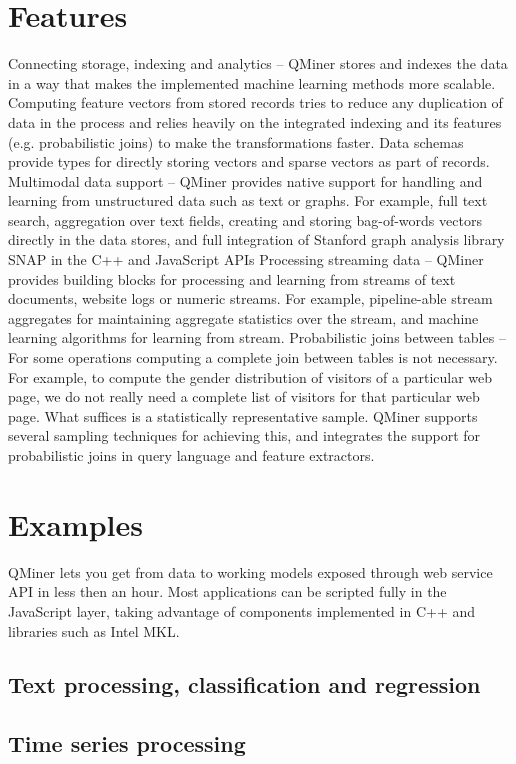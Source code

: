 \documentclass{article} %
\begin{document}
\section{Features}
Connecting storage, indexing and analytics – QMiner stores and indexes the data in a way that makes the implemented machine learning methods more scalable. Computing feature vectors from stored records tries to reduce any duplication of data in the process and relies heavily on the integrated indexing and its features (e.g. probabilistic joins) to make the transformations faster. Data schemas provide types for directly storing vectors and sparse vectors as part of records.
Multimodal data support – QMiner provides native support for handling and learning from unstructured data such as text or graphs. For example, full text search, aggregation over text fields, creating and storing bag-of-words vectors directly in the data stores, and full integration of Stanford graph analysis library SNAP in the C++ and JavaScript APIs
Processing streaming data – QMiner provides building blocks for processing and learning from streams of text documents, website logs or numeric streams. For example, pipeline-able stream aggregates for maintaining aggregate statistics over the stream, and machine learning algorithms for learning from stream.
Probabilistic joins between tables – For some operations computing a complete join between tables is not necessary. For example, to compute the gender distribution of visitors of a particular web page, we do not really need a complete list of visitors for that particular web page. What suffices is a statistically representative sample. QMiner supports several sampling techniques for achieving this, and integrates the support for probabilistic joins in query language and feature extractors.


\section{Examples}
QMiner lets you get from data to working models exposed through web service API in less then an hour. Most applications can be scripted fully in the JavaScript layer, taking advantage of components implemented in C++ and libraries such as Intel MKL.


\subsection{Text processing, classification and regression}

\subsection{Time series processing}
\end{document}
